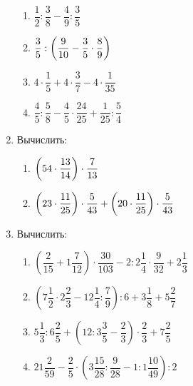 \documentclass[12pt, a4paper]{article}
\begin{document}
\begin{enumerate}
\begin{multicols}{2}
\begin{enumerate}[label=\textbf{\arabic*)}]
			\item \( \dfrac{1}{2}:\dfrac{3}{8}-\dfrac{4}{9}:\dfrac{3}{5} \)
			\item \( \dfrac{3}{5}:\left(\dfrac{9}{10}-\dfrac{3}{5}\cdot\dfrac{8}{9}\right) \)
			\item \( 4\cdot\dfrac{1}{5}+4\cdot\dfrac{3}{7}-4\cdot\dfrac{1}{35} \)
			\item \( \dfrac{4}{5}:\dfrac{5}{8}-\dfrac{4}{5}\cdot\dfrac{24}{25}+\dfrac{1}{25}:\dfrac{5}{4} \)
		\end{enumerate}
	\end{multicols}
	\item Вычислить:
	\begin{multicols}{2}
		\begin{enumerate}[label=\textbf{\arabic*)}]
			\item \( \left(54\cdot\dfrac{13}{14}\right)\cdot\dfrac{7}{13} \)
			\item \( \left(23\cdot\dfrac{11}{25}\right)\cdot\dfrac{5}{43}+\left(20\cdot\dfrac{11}{25}\right)\cdot\dfrac{5}{43} \)
		\end{enumerate}
	\end{multicols}
	\item Вычислить:
	\begin{enumerate}[label=\textbf{\arabic*)}]
		\item \( \left( \dfrac{2}{15}+1\dfrac{7}{12} \right)\cdot\dfrac{30}{103}-2:2\dfrac{1}{4}\cdot\dfrac{9}{32}+2\dfrac{1}{3} \)
		\item \( \left( 7\dfrac{1}{2}\cdot2\dfrac{2}{3}-12\dfrac{1}{4}:\dfrac{7}{9} \right):6+3\dfrac{1}{8}+5\dfrac{2}{7} \)
		\item \( 5\dfrac{1}{3}:6\dfrac{2}{5}+\left( 12:3\dfrac{3}{5}-\dfrac{2}{3} \right)\cdot\dfrac{2}{3}+7\dfrac{2}{5} \)
		\item \( 21\dfrac{2}{59}-\dfrac{2}{5}\cdot\left( 3\dfrac{15}{28}:\dfrac{9}{28}-1:1\dfrac{10}{49} \right):2 \)
	\end{enumerate}
\end{enumerate}
\end{document}
